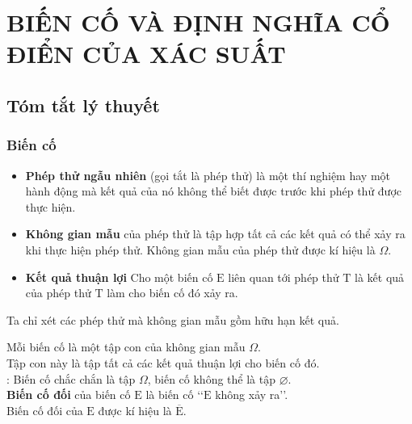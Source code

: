 \setcounter{section}{4}
\setcounter{dang}{0}
\section*{BIẾN CỐ VÀ ĐỊNH NGHĨA CỔ ĐIỂN CỦA XÁC SUẤT}
\subsection{Tóm tắt lý thuyết}
\subsubsection{Biến cố}
\begin{itemize}
	\item {\bf{Phép thử ngẫu nhiên}} (gọi tắt là phép thử) là một thí nghiệm hay một hành động mà kết quả của nó không thể biết được trước khi phép thử được thực hiện.
	\item {\bf{Không gian mẫu}} của phép thử là tập hợp tất cả  các kết quả có thể xảy ra khi thực hiện phép thử. Không gian mẫu của phép thử được kí hiệu là $ \Omega $.
	\item {\bf{Kết quả thuận lợi}} Cho một biến cố $ \mathrm{E} $ liên quan tới phép thử $ \mathrm{T} $ là kết quả của phép thử $ \mathrm{T} $ làm cho biến cố  đó xảy ra.
\end{itemize}
\begin{note}
	Ta chỉ xét các phép thử mà không gian mẫu gồm hữu hạn kết quả.
\end{note} 
Mỗi biến cố là một tập con của không gian mẫu $ \Omega $. \\
Tập con này  là tập tất cả các kết quả thuận lợi cho biến cố đó.\\
: Biến cố chắc chắn là tập $ \Omega $, biến cố không thể là tập $ \varnothing $.	\\
{\bf{Biến cố đối}} của biến cố $ \mathrm{E} $ là biến cố \lq\lq  $ \mathrm{E}$ không xảy ra\rq\rq.\\
Biến cố đối của $ \mathrm{E} $ được kí hiệu là $ \mathrm{\overline{E}} $.
